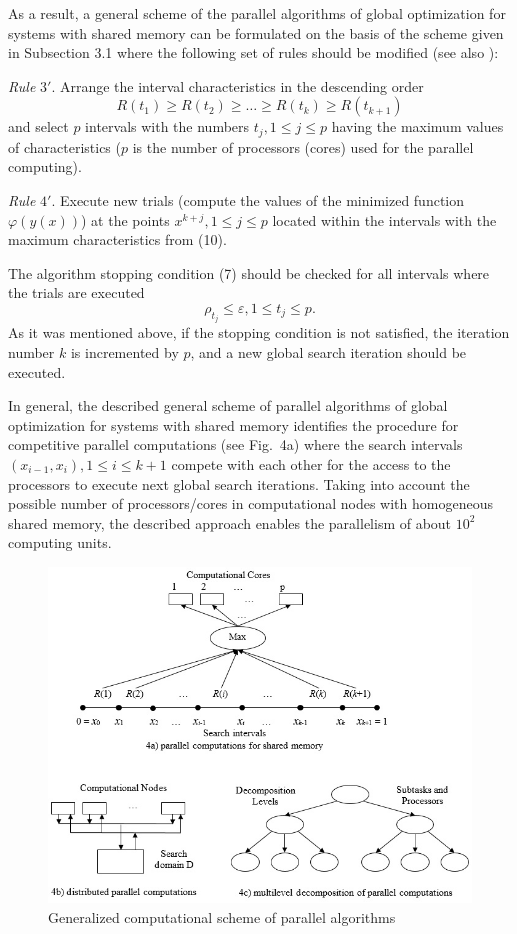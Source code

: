 \documentclass[
11pt,%
tightenlines,%
twoside,%
onecolumn,%
nofloats,%
nobibnotes,%
nofootinbib,%
superscriptaddress,%
noshowpacs,%
centertags]%
{revtex4}
\begin{document}
As a result, a general scheme of the parallel algorithms of global optimization for systems with shared memory can be formulated on the basis of the scheme given in Subsection 3.1 where the following set of rules should be modified (see also \cite{Strongin1, Strongin2, Strongin4, Grishagin2}):

\textit{Rule} $3'$. Arrange the interval characteristics in the descending order
\begin{equation}
R(t_1) \geq R(t_2) \geq \dots \geq R(t_k) \geq R(t_{k+1})
\end{equation}
and select $p$ intervals with the numbers $t_j, 1 \leq j \leq p$ having the maximum values of characteristics ($p$ is the number of processors (cores) used for the parallel computing).

\textit{Rule} $4'$. Execute new trials (compute the values of the minimized function $\varphi(y(x))$) at the points $x^{k+j}, 1 \leq j \leq p$ located within the intervals with the maximum characteristics from (10).

The algorithm stopping condition (7) should be checked for all intervals where the trials are executed
\begin{equation}
\rho_{t_j} \leq \varepsilon, 1 \leq t_j \leq p.
\end{equation}
As it was mentioned above, if the stopping condition is not satisfied, the iteration number $k$ is incremented by $p$, and a new global search iteration should be executed.

In general, the described general scheme of parallel algorithms of global optimization for systems with shared memory identifies the procedure for competitive parallel computations (see Fig.~4a) where the search intervals $(x_{i-1} ,x_i), 1 \leq i \leq k + 1$ compete with each other for the access to the processors to execute next global search iterations. Taking into account the possible number of processors/cores in computational nodes with homogeneous shared memory, the described approach enables the parallelism of about $10^2$ computing units.

\begin{figure}[t]
\centering
\includegraphics[width=13.0cm]{Fig4}
\caption{Generalized computational scheme of parallel algorithms}
\label{fig:Fig4}
\end{figure}
\end{document}
